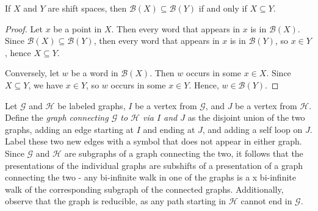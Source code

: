 \documentclass[hidelinks]{article}
\newcommand{\Lc}{\mathcal{L}}  %
\newcommand{\Gc}{\mathcal{G}}  %
\newcommand{\Hc}{\mathcal{H}}  %
\newcommand{\Bc}{\mathcal{B}}
\newcommand{\shift}[1]{\mathsf{X}_{#1}}
\newcommand{\term}[1]{\textit{#1}}
\theoremstyle{definition}
\begin{document}


    \begin{lemma}
        If \(X\) and \(Y\) are shift spaces, then \(\Bc(X) \subseteq \Bc(Y)\) if and only if \(X \subseteq Y\).
    \end{lemma}

    \begin{proof}
        Let \(x\) be a point in \(X\). Then every word that appears in \(x\) is in \(\Bc(X)\). Since 
        \(\Bc(X) \subseteq \Bc(Y)\), then every word that appears in \(x\) is in \(\Bc(Y)\),
        so \(x \in Y\), hence \(X \subseteq Y\).

        Conversely, let \(w\) be a word in \(\Bc(X)\). Then \(w\) occurs in some \(x \in X\). 
        Since \(X \subseteq Y\), we have \(x \in Y\), so \(w\) occurs in some \(x \in Y\). Hence, \(w \in \Bc(Y)\).
    \end{proof}

    Let \(\Gc\) and \(\Hc\) be labeled graphs, \(I\) be a vertex from \(\Gc\), and \(J\) 
    be a vertex from \(\Hc\). Define the \term{graph connecting \(\Gc\) to \(\Hc\) via \(I\) and \(J\)} 
    as the disjoint union of the two graphs, adding an edge starting at \(I\) and ending at \(J\), 
    and adding a self loop on \(J\). Label these two new edges with a symbol that 
    does not appear in either graph. 
    Since \(\Gc\) and \(\Hc\) are subgraphs of a graph connecting the two,
    it follows that the presentations of the individual graphs are subshifts of a presentation 
    of a graph connecting the two - any bi-infinite walk in one of the graphs is a x
    bi-infinite walk of the corresponding subgraph of the connected graphs.
    Additionally, observe that the graph is reducible,
    as any path starting in \(\Hc\) cannot end in \(\Gc\).
    
\end{document}
